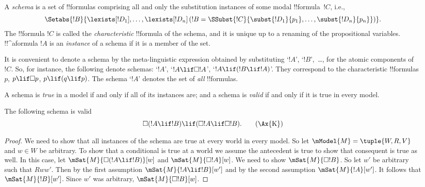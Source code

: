 \documentclass[../../../include/open-logic-section]{subfiles}
\begin{document}


\begin{defn}
  A \emph{schema} is a set of !!{formula}s comprising all
  and only the substitution instances of some modal !!{formula}~$!C$, i.e.,
  \[
  \Setabs{!B}{\lexists[!D_1], \dots, \lexists[!D_n] \left(!B =
  \SSubst{!C}{\subst{!D_1}{p_1}, \dots, \subst{!D_n}{p_n}} \right) }.
  \]
  The !!{formula} $!C$ is called the \emph{characteristic} !!{formula} of
  the schema, and it is unique up to a renaming of the propositional
  variables. !!^a{formula} $!A$ is an \emph{instance} of a schema if
  it is a member of the set.
\end{defn}

It is convenient to denote a schema by the meta-linguistic expression
obtained by substituting `$!A$', `$!B$',~\dots, for the atomic
components of~$!C$. So, for instance, the following denote schemas:
`$!A$', `$!A \lif \Box!A$', `$!A \lif (!B \lif !A)$'. They correspond
to the characteristic !!{formula}s $p$, $p \lif \Box p$, $p \lif (q
\lif p)$. The schema `$!A$' denotes the set of \emph{all}
!!{formula}s.

\begin{defn}
  A schema is \emph{true} in a model if and only if all of its instances
  are; and a schema is \emph{valid} if and only if it is true in every
  model. 
\end{defn}

\begin{prop}
  The following schema  is valid
  \[
  \Box(!A \lif !B) \lif (\Box !A \lif \Box !B). \tag{\Ax{K}}
  \]
\end{prop}

\begin{proof}
  We need to show that all instances of the schema are true at every
  world in every model. So let $\mModel{M} = \tuple{W,R,V}$ and $w \in
  W$ be arbitrary. To show that a conditional is true at a world we
  assume the antecedent is true to show that consequent is true as
  well. In this case, let $\mSat{M}{\Box(!A \lif !B)}[w]$ and
  $\mSat{M}{\Box !A}[w]$. We need to show $\mSat{M}{\Box !B}$. So let
  $w'$ be arbitrary such that $Rww'$. Then by the first assumption
  $\mSat{M}{!A \lif !B}[w']$ and by the second assumption
  $\mSat{M}{!A}[w']$. It follows that $\mSat{M}{!B}[w']$. Since $w'$
  was arbitrary, $\mSat{M}{\Box !B}[w]$.
\end{proof}
\end{document}
